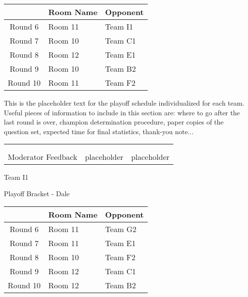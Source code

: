 \documentclass{article}%
\begin{document}
\vspace*{4pt}%
%
\begin{tabularx}{\textwidth}{|c|Y|Y|}%
\hline%
&Room Name&Opponent\\%
\hline%
Round 6&Room 11&Team I1\\%
Round 7&Room 10&Team C1\\%
Round 8&Room 12&Team E1\\%
Round 9&Room 10&Team B2\\%
Round 10&Room 11&Team F2\\%
\hline%
\end{tabularx}%
\vspace*{30pt}%
\linebreak%
This is the placeholder text for the playoff schedule individualized for each team. Useful pieces of information to include in this section are: where to go after the last round is over, champion determination procedure, paper copies of the question set, expected time for final statistics, thank{-}you note...%
\vspace*{30pt}%
\newline%
%
\begin{tabularx}{\textwidth}{YYY}%
  &  &  \\%
\\%
Moderator Feedback&placeholder&placeholder\\%
\end{tabularx}%
\newpage%
\begin{center}%
\begin{Huge}%
Team I1%
\end{Huge}%
\vspace*{12pt}%
\linebreak%
\begin{Large}%
Playoff Bracket {-} Dale%
\end{Large}%
\end{center}%
\vspace*{4pt}%
%
\begin{tabularx}{\textwidth}{|c|Y|Y|}%
\hline%
&Room Name&Opponent\\%
\hline%
Round 6&Room 11&Team G2\\%
Round 7&Room 11&Team E1\\%
Round 8&Room 10&Team F2\\%
Round 9&Room 12&Team C1\\%
Round 10&Room 12&Team B2\\%
\hline%
\end{tabularx}%
\end{document}
